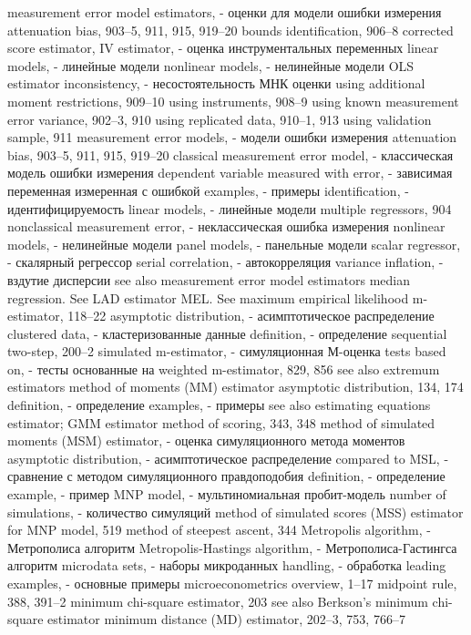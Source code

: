measurement error model estimators, - оценки для модели ошибки измерения
attenuation bias, 903–5, 911, 915, 919–20 
bounds identification, 906–8
corrected score estimator, 
IV estimator, - оценка инструментальных переменных
linear models, - линейные модели
nonlinear models, - нелинейные модели
OLS estimator inconsistency, - несостоятельность МНК оценки
using additional moment restrictions, 909–10 
using instruments, 908–9
using known measurement error variance, 902–3, 910
using replicated data, 910–1, 913
using validation sample, 911 
measurement error models, - модели ошибки измерения
attenuation bias, 903–5, 911, 915, 919–20 
classical measurement error model, - классическая модель ошибки измерения
dependent variable measured with error, - зависимая переменная измеренная с ошибкой
examples, - примеры
identification, - идентифицируемость
linear models, - линейные модели
multiple regressors, 904
nonclassical measurement error, - неклассическая ошибка измерения
nonlinear models, - нелинейные модели
panel models, - панельные модели
scalar regressor, - скалярный регрессор
serial correlation, - автокорреляция
variance inflation, - вздутие дисперсии
see also measurement error model estimators
median regression. See LAD estimator MEL. See maximum empirical likelihood m-estimator, 118–22
asymptotic distribution, - асимптотическое распределение
clustered data, - кластеризованные данные
definition, - определение
sequential two-step, 200–2 
simulated m-estimator, - симуляционная М-оценка
tests based on, - тесты основанные на
weighted m-estimator, 829, 856 see also extremum estimators
method of moments (MM) estimator asymptotic distribution, 134, 174 
definition, - определение
examples, - примеры
see also estimating equations estimator; GMM estimator
method of scoring, 343, 348
method of simulated moments (MSM) estimator, - оценка симуляционного метода моментов
asymptotic distribution, - асимптотическое распределение
compared to MSL, - сравнение с методом симуляционного правдоподобия
definition, - определение
example, - пример
MNP model, - мультиномиальная пробит-модель
number of simulations, - количество симуляций
method of simulated scores (MSS) estimator for MNP model, 519
method of steepest ascent, 344
Metropolis algorithm, - Метрополиса алгоритм
Metropolis-Hastings algorithm, - Метрополиса-Гастингса алгоритм
microdata sets, - наборы микроданных
handling, - обработка
leading examples, - основные примеры
microeconometrics overview, 1–17 midpoint rule, 388, 391–2 minimum chi-square estimator, 203
see also Berkson’s minimum chi-square estimator minimum distance (MD) estimator, 202–3, 753, 766–7
